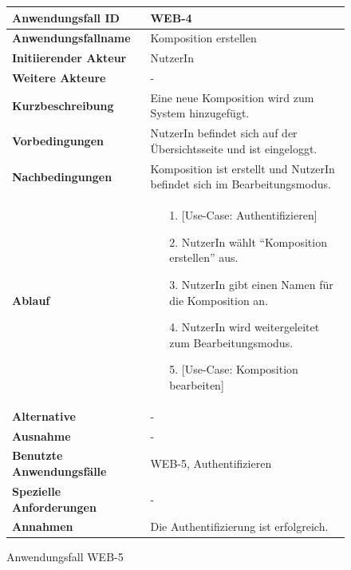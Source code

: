\begin{figure}[h]
	\centering
	\begin{tabularx}{\textwidth}{ X | X }
		\textbf{Anwendungsfall ID} & WEB-4 \\ \hline
		\textbf{Anwendungsfallname} & Komposition erstellen \\ \hline
		\textbf{Initiierender Akteur} & NutzerIn \\ \hline
		\textbf{Weitere Akteure} & - \\ \hline
		\textbf{Kurzbeschreibung} & Eine neue Komposition wird zum System hinzugefügt. \\ \hline
		\textbf{Vorbedingungen} & NutzerIn befindet sich auf der Übersichtsseite und ist eingeloggt.  \\ \hline
		\textbf{Nachbedingungen} & Komposition ist erstellt und NutzerIn befindet sich im Bearbeitungsmodus. \\ \hline
		\textbf{Ablauf} &
		\begin{enumerate}
			\item[1.]  [Use-Case: Authentifizieren]
			\item[2.]  NutzerIn wählt ``Komposition erstellen'' aus.
			\item[3.]  NutzerIn gibt einen Namen für die Komposition an.
			\item[4.]  NutzerIn wird weitergeleitet zum Bearbeitungsmodus.
			\item[5.] [Use-Case: Komposition bearbeiten]
		\end{enumerate} \\ \hline
		\textbf{Alternative} & - \\ \hline
		\textbf{Ausnahme} & - \\ \hline
		\textbf{Benutzte Anwendungsfälle} & WEB-5, Authentifizieren\\ \hline
		\textbf{Spezielle Anforderungen} & - \\ \hline
		\textbf{Annahmen} & Die Authentifizierung ist erfolgreich.
	\end{tabularx}
	\caption{Anwendungsfall WEB-5}
	\label{fig:anwendungsfall-server-tabelle-web-4}
\end{figure}

